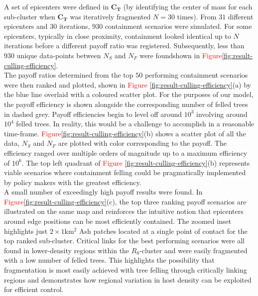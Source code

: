 A set of epicenters were defined in $\mathbf{C_T}$ (by identifying the center of mass for each sub-cluster when $\mathbf{C_T}$ was iteratively fragmented $N=30$ times). From $31$ different epicenters and $30$ iterations, $930$ containment scenarios were simulated. For some epicenters, typically in close proximity, containment looked identical up to $N$ iterations before a different payoff ratio was registered. Subsequently, less than $930$ unique data-points between $N_S$ and $N_F$ were found\textemdash shown in \textcolor{red}{Figure\ref{fig:result-culling-efficiency}}.\\

The payoff ratios determined from the top $50$ performing containment scenarios were then ranked and plotted, shown in \textcolor{red}{Figure} \ref{fig:result-culling-efficiency}(a) by the blue line overlaid with a coloured scatter plot. For the purposes of our model, the payoff efficiency is shown alongside the corresponding number of felled trees in dashed grey. Payoff efficiencies begin to level off around $\mathrm{10^3}$ involving around $\mathrm{10^4}$ felled trees. In reality, this would be a challenge to accomplish in a reasonable time-frame. \textcolor{red}{Figure}\ref{fig:result-culling-efficiency}(b) shows a scatter plot of all the data, $N_S$ and $N_F$ are plotted with color corresponding to the payoff. The efficiency ranged over multiple orders of magnitude up to a maximum efficiency of $\mathrm{10^6}$. The top left quadrant of \textcolor{red}{Figure} \ref{fig:result-culling-efficiency}(b) represents viable scenarios where containment felling could be pragmatically implemented by policy makers with the greatest efficiency.\\

A small number of exceedingly high payoff results were found. In \textcolor{red}{Figure}\ref{fig:result-culling-efficiency}(c), the top three ranking payoff scenarios are illustrated on the same map and reinforces the intuitive notion that epicenters around edge positions can be most efficiently contained. The zoomed inset highlights just $\mathrm{2\times 1km^2}$ Ash patches located at a single point of contact for the top ranked sub-cluster. Critical links for the best performing scenarios were all found in lower-density regions within the $R_0$-cluster and were easily fragmented with a low number of felled trees. This highlights the possibility that fragmentation is most easily achieved with tree felling through critically linking regions and demonstrates how regional variation in host density can be exploited for efficient control. 


